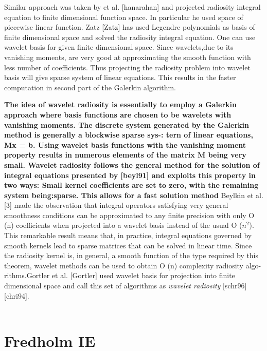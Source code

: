 Similar approach was taken by et al. [hanarahan] and projected radiosity integral equation to finite dimensional function space. In particular he used space of piecewise linear function. Zatz [Zatz] has used Legendre polynomials as basis of finite dimensional space and solved the radiosity integral equation. One can use wavelet basis for given finite dimensional space. Since wavelets,due to its vanishing moments, are very good at approximating the smooth function with less number of coefficients. Thus projecting the radiosity problem into wavelet basis will give sparse system of linear equations. This results in the faster computation in second part of the Galerkin algorithm. 

{\bf The idea of wavelet radiosity is essentially to employ a Galerkin approach where basis functions are chosen to be wavelets with vanishing moments. The discrete system generated by the Galerkin method is generally a blockwise sparse sys-:
tern of linear equations, Mx = b. Using wavelet basis functions with the vanishing moment
property results in numerous elements of the matrix M being very small. Wavelet radiosity
follows the general method for the solution of integral equations presented by [beyl91] and
exploits this property in two ways:
Small kernel coefficients are set to zero, with the remaining system being:sparse. This
allows for a fast solution method} Beylkin et al. [3] made the observation that integral operators satisfying very general smoothness conditions can be approximated to any finite precision with only O (n) coefficients
when projected into a wavelet basis instead of the usual O ($n^2$).
This remarkable result means that, in practice, integral equations
governed by smooth kernels lead to sparse matrices that can be
solved in linear time. Since the radiosity kernel is, in general,
a smooth function of the type required by this theorem, wavelet
methods can be used to obtain O (n) complexity radiosity algo-
rithms.Gortler et al. [Gortler] used wavelet basis for projection into finite dimensional space and call this set of algorithms as {\em wavelet radiosity} [schr96][chri94]. \\\\


\section{Fredholm IE}

